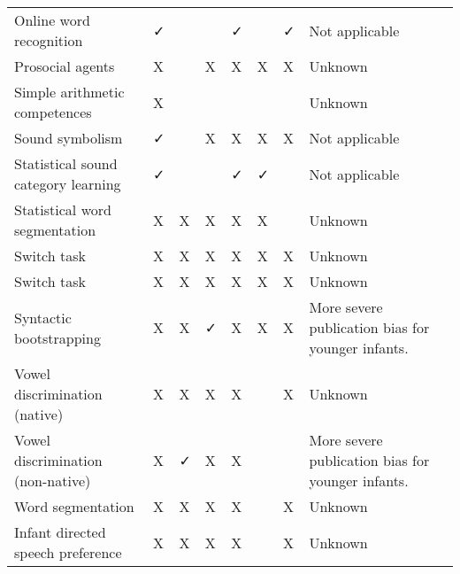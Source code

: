 \documentclass[
]{article}
\begin{document}
\begin{table}[tbp]
\begin{center}
\begin{threeparttable}
\begin{tabular}{llllllll}
Online word recognition & ✓ &  &  & ✓ &  & ✓ & Not applicable\\
Prosocial agents & X &  & X & X & X & X & Unknown\\
Simple arithmetic competences & X &  &  &  &  &  & Unknown\\
Sound symbolism & ✓ &  & X & X & X & X & Not applicable\\
Statistical sound category learning & ✓ &  &  & ✓ & ✓ &  & Not applicable\\
Statistical word segmentation & X & X & X & X & X &  & Unknown\\
Switch task & X & X & X & X & X & X & Unknown\\
Switch task & X & X & X & X & X & X & Unknown\\
Syntactic bootstrapping & X & X & ✓ & X & X & X & More severe publication bias for younger infants.\\
Vowel discrimination (native) & X & X & X & X &  & X & Unknown\\
Vowel discrimination (non-native) & X & ✓ & X & X &  &  & More severe publication bias for younger infants.\\
Word segmentation & X & X & X & X &  & X & Unknown\\
Infant directed speech preference & X & X & X & X &  & X & Unknown\\
\bottomrule
\end{tabular}

\end{threeparttable}
\end{center}

\end{table}
\end{document}
